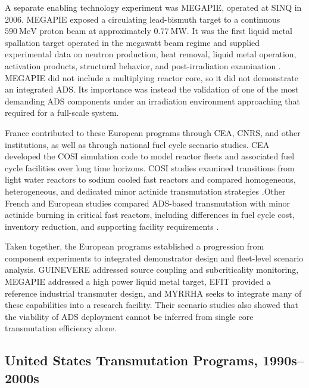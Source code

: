 A separate enabling technology experiment was \gls{MEGAPIE},
operated at \gls{SINQ} in 2006.
\gls{MEGAPIE} exposed a circulating lead-bismuth target to a continuous
\(590~\mathrm{MeV}\) proton beam at approximately \(0.77~\mathrm{MW}\).
It was the first liquid metal spallation target operated in the megawatt beam
regime and supplied experimental data on neutron production, heat removal,
liquid metal operation, activation products, structural behavior, and
post-irradiation examination
\cite{bauer_megapie_2001,wagner_megapie_2008,
panebianco_neutronic_2007}. \gls{MEGAPIE} did not include a multiplying reactor core,
so it did not demonstrate an integrated \gls{ADS}. Its importance was instead the
validation of one of the most demanding \gls{ADS} components under an irradiation
environment approaching that required for a full-scale system.

France contributed to these European programs through \gls{CEA}, \gls{CNRS}, and other
institutions, as well as through national fuel cycle scenario studies. \gls{CEA}
developed the \gls{COSI} simulation code to model reactor fleets and associated
fuel cycle facilities over long time horizons. \gls{COSI} studies examined
transitions from light water reactors to sodium cooled fast reactors and
compared homogeneous, heterogeneous, and dedicated minor actinide
transmutation strategies
\cite{coquelet_pascal_cosi6_2015}.Other French and European studies compared
\gls{ADS}-based transmutation with minor actinide burning in critical fast reactors,
including differences in fuel cycle cost, inventory reduction, and supporting
facility requirements \cite{chabert_technical_2013,cross_check_2016}.

Taken together, the European programs established a progression from
component experiments to integrated demonstrator design and fleet-level
scenario analysis. \gls{GUINEVERE} addressed source coupling and subcriticality
monitoring, \gls{MEGAPIE} addressed a high power liquid metal target, \gls{EFIT} provided
a reference industrial transmuter design, and \gls{MYRRHA} seeks to integrate many
of these capabilities into a research facility. Their scenario studies also
showed that the viability of \gls{ADS} deployment cannot be inferred from
single core transmutation efficiency alone.

\subsection{United States Transmutation Programs, 1990s--2000s}
\label{subsec:us-transmutation-programs}

